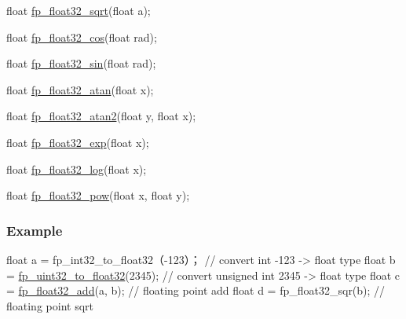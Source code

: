 \begin{DoxyCode}
\textcolor{keywordtype}{float} \mbox{\hyperlink{a00074_ac9741031a1d28dfc772309900506d51b}{fp\_float32\_sqrt}}(\textcolor{keywordtype}{float} a);

\textcolor{keywordtype}{float} \mbox{\hyperlink{a00074_a76d63763a1fbbbed015ad39ff22a1a99}{fp\_float32\_cos}}(\textcolor{keywordtype}{float} rad);

\textcolor{keywordtype}{float} \mbox{\hyperlink{a00074_ae57383891f734bc754b6ade61fed3677}{fp\_float32\_sin}}(\textcolor{keywordtype}{float} rad);

\textcolor{keywordtype}{float} \mbox{\hyperlink{a00074_afff3776b0834631c841e3799f545f7a0}{fp\_float32\_atan}}(\textcolor{keywordtype}{float} x);

\textcolor{keywordtype}{float} \mbox{\hyperlink{a00074_aa7b8601248d31c15f917e4d8f4f6e9d9}{fp\_float32\_atan2}}(\textcolor{keywordtype}{float} y, \textcolor{keywordtype}{float} x);

\textcolor{keywordtype}{float} \mbox{\hyperlink{a00074_a595d6a7d9a0a116f0db5bd4cfdbcd166}{fp\_float32\_exp}}(\textcolor{keywordtype}{float} x);

\textcolor{keywordtype}{float} \mbox{\hyperlink{a00074_a694db5e30e3f76718f29bacd4e044135}{fp\_float32\_log}}(\textcolor{keywordtype}{float} x);

\textcolor{keywordtype}{float} \mbox{\hyperlink{a00074_ac888f98a6e5d89837b647d2c81725836}{fp\_float32\_pow}}(\textcolor{keywordtype}{float} x, \textcolor{keywordtype}{float} y);
\end{DoxyCode}


\subsubsection*{Example}


\begin{DoxyCode}
\textcolor{keywordtype}{float} a = fp\_int32\_to\_float32（-123）；  \textcolor{comment}{// convert int -123 -> float type}
\textcolor{keywordtype}{float} b = \mbox{\hyperlink{a00074_a096ed4a261247431549a71225761fffc}{fp\_uint32\_to\_float32}}(2345);   \textcolor{comment}{// convert unsigned int 2345 -> float type}
\textcolor{keywordtype}{float} c = \mbox{\hyperlink{a00074_a05d59640c2e2b66e3f13e423c0779ce9}{fp\_float32\_add}}(a, b);         \textcolor{comment}{// floating point add}
\textcolor{keywordtype}{float} d = fp\_float32\_sqr(b);            \textcolor{comment}{// floating point sqrt}
\end{DoxyCode}
 